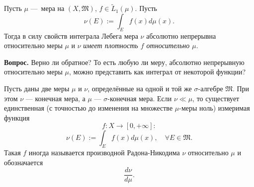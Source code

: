 \begin{example}
    Пусть $\mu$ — мера на $(X, \mathfrak{M})$, $f \in \widetilde{L}_1(\mu)$.
    Пусть
    \[\nu(E):= \int_E f(x) d\mu(x).\]
    Тогда в силу свойств интеграла Лебега мера $\nu$ абсолютно непрерывна относительно меры $\mu$ и $\nu$ \textit{имеет плотность $f$ относительно $\mu$}.
\end{example}

\noindent \textbf{Вопрос.} Верно ли обратное? То есть любую ли меру, абсолютно непрерывную относительно меры $\mu$, можно представить как интеграл от некоторой функции?

\begin{theorem}
    Пусть даны две меры $\mu$ и $\nu$, определённые на одной и той же $\sigma$-алгебре $\mathfrak{M}$. При этом $\nu$ — конечная мера, а $\mu$ — $\sigma$-конечная мера. Если $\nu \ll \mu$, то существует единственная (с точностью до изменения на множестве $\mu$-меры ноль) измеримая функция
    \[f: X \to [0, +\infty]:\]
    \[\nu(E) := \int_E f(x) d\mu(x), \quad \forall E \in \mathfrak{M}.\]
    Такая $f$ иногда называется производной Радона-Никодима $\nu$ относительно $\mu$ и обозначается
    \[\frac{d\nu}{d\mu}.\]
\end{theorem} 
